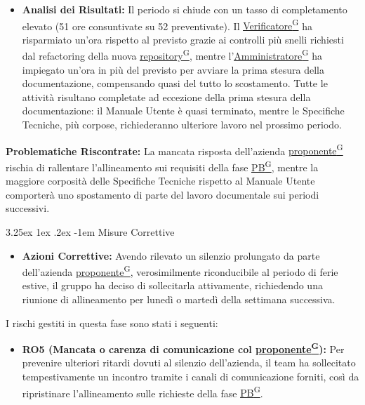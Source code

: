 \documentclass[a4paper,12pt]{article}
\makeatletter
\renewcommand\paragraph{\@startsection{paragraph}{5}{\z@}%
  {3.25ex \@plus1ex \@minus.2ex}%
  {-1em}%
  {\normalfont\normalsize\bfseries}}
\providecommand{\glslink}[2]{\href{https://alittlebyte-19.github.io/Documentazione/glossario.html\#gls-#1}{\underline{#2}\textsuperscript{\scriptsize G}}}
\makeatother
\begin{document}
\begin{itemize}
    \item \textbf{Analisi dei Risultati:} Il periodo si chiude con un tasso di completamento elevato (51 ore consuntivate su 52 preventivate). Il \glslink{verificatore}{Verificatore} ha risparmiato un'ora rispetto al previsto grazie ai controlli più snelli richiesti dal refactoring della nuova \glslink{repository}{repository}, mentre l'\glslink{amministratore}{Amministratore} ha impiegato un'ora in più del previsto per avviare la prima stesura della documentazione, compensando quasi del tutto lo scostamento. Tutte le attività risultano completate ad eccezione della prima stesura della documentazione: il Manuale Utente è quasi terminato, mentre le Specifiche Tecniche, più corpose, richiederanno ulteriore lavoro nel prossimo periodo.
\end{itemize}
\textbf{Problematiche Riscontrate:} La mancata risposta dell'azienda \glslink{committente-proponente}{proponente} rischia di rallentare l'allineamento sui requisiti della fase \glslink{pb-product-baseline}{PB}, mentre la maggiore corposità delle Specifiche Tecniche rispetto al Manuale Utente comporterà uno spostamento di parte del lavoro documentale sui periodi successivi.


\paragraph{Misure Correttive}

\begin{itemize}
    \item \textbf{Azioni Correttive:} Avendo rilevato un silenzio prolungato da parte dell'azienda \glslink{committente-proponente}{proponente}, verosimilmente riconducibile al periodo di ferie estive, il gruppo ha deciso di sollecitarla attivamente, richiedendo una riunione di allineamento per lunedì o martedì della settimana successiva.
\end{itemize}
I rischi gestiti in questa fase sono stati i seguenti:
\begin{itemize}
    \item \textbf{RO5 (Mancata o carenza di comunicazione col \glslink{committente-proponente}{proponente}):} Per prevenire ulteriori ritardi dovuti al silenzio dell'azienda, il team ha sollecitato tempestivamente un incontro tramite i canali di comunicazione forniti, così da ripristinare l'allineamento sulle richieste della fase \glslink{pb-product-baseline}{PB}.
\end{itemize}
\end{document}
